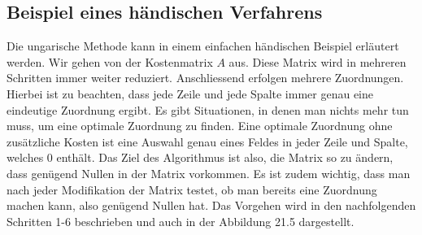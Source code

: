 \subsection{Beispiel eines händischen Verfahrens
\label{munkres:subsection:malorum}}

Die ungarische Methode kann in einem einfachen händischen Beispiel erläutert werden. Wir gehen von der Kostenmatrix $A$ aus. Diese Matrix wird in mehreren Schritten immer weiter reduziert. Anschliessend erfolgen mehrere Zuordnungen. Hierbei ist zu beachten, dass jede Zeile und jede Spalte immer genau eine eindeutige Zuordnung ergibt. Es gibt Situationen, in denen man nichts mehr tun muss, um eine optimale Zuordnung zu finden. Eine optimale Zuordnung ohne zusätzliche Kosten ist eine Auswahl genau eines Feldes in jeder Zeile und Spalte, welches 0 enthält. Das Ziel des Algorithmus ist also, die Matrix so zu ändern, dass genügend Nullen in der Matrix vorkommen. Es ist zudem wichtig, dass man nach jeder Modifikation der Matrix testet, ob man bereits eine Zuordnung machen kann, also genügend Nullen hat.
Das Vorgehen wird in den nachfolgenden Schritten 1-6 beschrieben und auch in der Abbildung 21.5 dargestellt.

